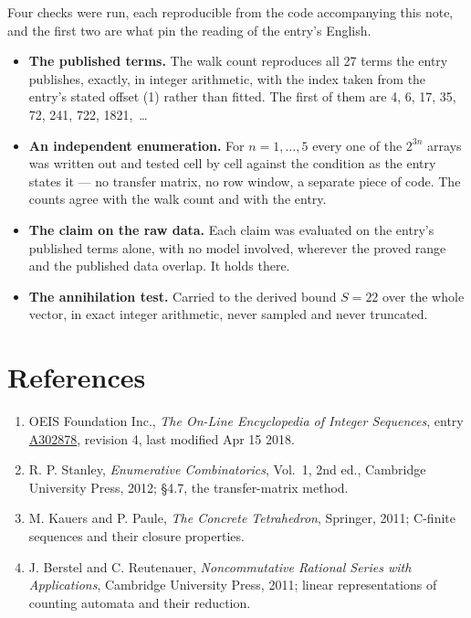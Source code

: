 \documentclass[11pt]{article}
\theoremstyle{definition}
\begin{document}
Four checks were run, each reproducible from the code accompanying this note, and the first two are what pin the reading of the entry's English.

\begin{itemize}

\item {\bfseries The published terms.} The walk count reproduces all 27 terms the entry publishes, exactly, in integer arithmetic, with the index taken from the entry's stated offset (1) rather than fitted. The first of them are 4, 6, 17, 35, 72, 241, 722, 1821,~\dots

\item {\bfseries An independent enumeration.} For $n = 1,\dots,5$ every one of the $2^{3n}$ arrays was written out and tested cell by cell against the condition as the entry states it --- no transfer matrix, no row window, a separate piece of code. The counts agree with the walk count and with the entry.

\item {\bfseries The claim on the raw data.} Each claim was evaluated on the entry's published terms alone, with no model involved, wherever the proved range and the published data overlap. It holds there.

\item {\bfseries The annihilation test.} Carried to the derived bound $S = 22$ over the whole vector, in exact integer arithmetic, never sampled and never truncated.

\end{itemize}

\section{References}

\begin{enumerate}

\item OEIS Foundation Inc., \emph{The On-Line Encyclopedia of Integer Sequences}, entry \href{https://oeis.org/A302878}{A302878}, revision 4, last modified Apr 15 2018.

\item R. P. Stanley, \emph{Enumerative Combinatorics}, Vol.~1, 2nd ed., Cambridge University Press, 2012; \S4.7, the transfer-matrix method.

\item M. Kauers and P. Paule, \emph{The Concrete Tetrahedron}, Springer, 2011; C-finite sequences and their closure properties.

\item J. Berstel and C. Reutenauer, \emph{Noncommutative Rational Series with Applications}, Cambridge University Press, 2011; linear representations of counting automata and their reduction.

\end{enumerate}
\end{document}
